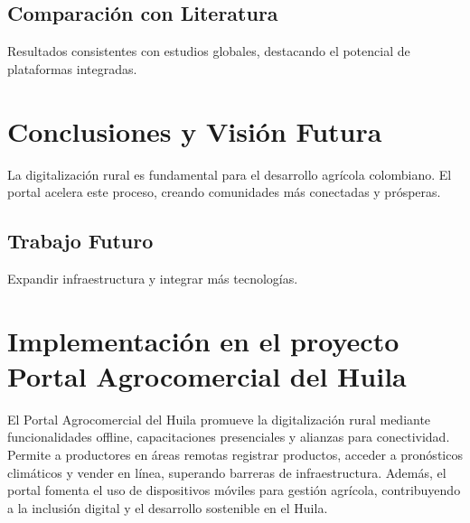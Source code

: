 \subsection{Comparación con Literatura}
Resultados consistentes con estudios globales, destacando el potencial de plataformas integradas.

\section{Conclusiones y Visión Futura}

La digitalización rural es fundamental para el desarrollo agrícola colombiano. El portal acelera este proceso, creando comunidades más conectadas y prósperas.

\subsection{Trabajo Futuro}
Expandir infraestructura y integrar más tecnologías.

\section{Implementación en el proyecto Portal Agrocomercial del Huila}

El Portal Agrocomercial del Huila promueve la digitalización rural mediante funcionalidades offline, capacitaciones presenciales y alianzas para conectividad. Permite a productores en áreas remotas registrar productos, acceder a pronósticos climáticos y vender en línea, superando barreras de infraestructura. Además, el portal fomenta el uso de dispositivos móviles para gestión agrícola, contribuyendo a la inclusión digital y el desarrollo sostenible en el Huila.